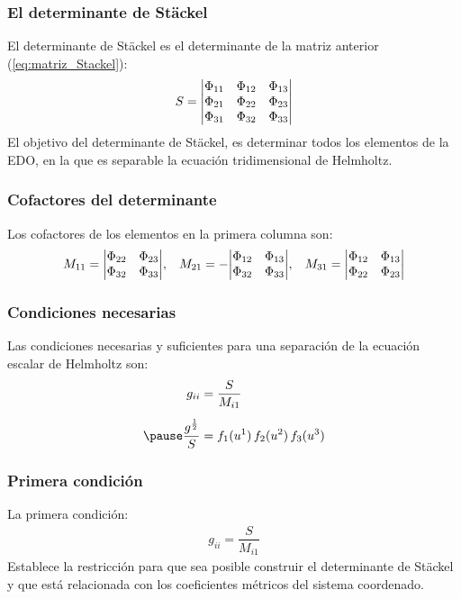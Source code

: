 \documentclass[12pt]{beamer}
\begin{document}
\begin{frame}
\frametitle{El determinante de Stäckel}
El determinante de Stäckel es el determinante de la matriz anterior (\ref{eq:matriz_Stackel}):
\pause
\begin{align}
S = \mqty|
\Phi_{11} & \Phi_{12} & \Phi_{13} \\
\Phi_{21} & \Phi_{22} & \Phi_{23} \\
\Phi_{31} & \Phi_{32} & \Phi_{33}
|
\label{eq:determinante_Stackel}
\end{align}
\pause
El objetivo del determinante de Stäckel, es determinar todos los elementos de la EDO, en la que es separable la ecuación tridimensional de Helmholtz.
\end{frame}
\begin{frame}
\frametitle{Cofactores del determinante}
Los cofactores de los elementos en la primera columna son:
\begin{align*}
M_{11} = \mqty|
\Phi_{22} & \Phi_{23} \\
\Phi_{32} & \Phi_{33}
| , \hspace{0.3cm}
M_{21} = -\mqty|
\Phi_{12} & \Phi_{13} \\
\Phi_{32} & \Phi_{33}
| , \hspace{0.3cm}
M_{31} = \mqty|
\Phi_{12} & \Phi_{13} \\
\Phi_{22} & \Phi_{23}
|
\end{align*}
\end{frame}
\begin{frame}
\frametitle{Condiciones necesarias}
Las condiciones necesarias y suficientes para una separación de la ecuación escalar de Helmholtz son:
\pause
\begin{equation}
\begin{aligned}
g_{ii} &= \dfrac{S}{M_{i1}} \\[0.5em] \pause
\dfrac{g^{\frac{1}{2}}}{S} &= f_{1} (u^{1}) \, f_{2} (u^{2}) \, f_{3} (u^{3})
\label{eq:ecuaciones_condiciones}
\end{aligned}  
\end{equation}
\end{frame}
\begin{frame}
\frametitle{Primera condición}
La primera condición:
\pause
\begin{align*}
g_{ii} = \dfrac{S}{M_{i1}}
\end{align*}
Establece la restricción para que sea posible construir el determinante de Stäckel y que está relacionada con los coeficientes métricos del sistema coordenado.
\end{frame}
\end{document}
